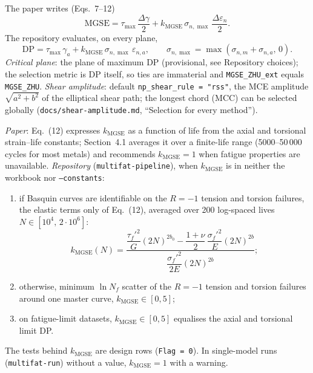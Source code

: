  The paper writes (Eqs.~7--12)
\begin{equation}
\mathrm{MGSE} = \tau_{\max}\,\frac{\Delta\gamma}{2} + k_\mathrm{MGSE}\,\sigma_{n,\max}\,\frac{\Delta\varepsilon_n}{2} .
\label{eq:mgsezhu-main}
\end{equation}
The repository evaluates, on every plane,
\begin{equation}
\mathrm{DP} = \tau_{\max}\,\gamma_a + k_\mathrm{MGSE}\,\sigma_{n,\max}\,\varepsilon_{n,a},\qquad
\sigma_{n,\max} = \max(\sigma_{n,m}+\sigma_{n,a},\,0) .
\label{eq:mgsezhu-plane}
\end{equation}
\emph{Critical plane}: the plane of maximum DP (provisional, see Repository choices); the selection
metric is DP itself, so ties are immaterial and \texttt{MGSE\_ZHU\_ext} equals \texttt{MGSE\_ZHU}.
\emph{Shear amplitude}: default \texttt{np\_shear\_rule = "rss"}, the MCE amplitude
$\sqrt{a^2+b^2}$ of the elliptical shear path; the longest chord (MCC) can be selected globally
(\texttt{docs/shear-amplitude.md}, ``Selection for every method'').

 \emph{Paper}: Eq.~(12) expresses $k_\mathrm{MGSE}$ as a function
of life from the axial and torsional strain--life constants; Section~4.1 averages it over a
finite-life range (5000--50\,000 cycles for most metals) and recommends $k_\mathrm{MGSE}=1$ when
fatigue properties are unavailable. \emph{Repository} (\texttt{multifat-pipeline}), when
$k_\mathrm{MGSE}$ is in neither the workbook nor \texttt{--constants}:
\begin{enumerate}
\item if Basquin curves are identifiable on the $R=-1$ tension and torsion failures, the elastic
  terms only of Eq.~(12), averaged over 200 log-spaced lives $N\in[10^4,\,2\cdot10^6]$:
  \begin{equation}
  k_\mathrm{MGSE}(N) = \frac{\dfrac{\tau_f'^2}{G}(2N)^{2b_0} - \dfrac{1+\nu}{2}\,\dfrac{\sigma_f'^2}{E}(2N)^{2b}}
  {\dfrac{\sigma_f'^2}{2E}(2N)^{2b}} ;
  \label{eq:mgsezhu-k}
  \end{equation}
\item otherwise, minimum $\ln N_f$ scatter of the $R=-1$ tension and torsion failures around one
  master curve, $k_\mathrm{MGSE}\in[0,5]$;
\item on fatigue-limit datasets, $k_\mathrm{MGSE}\in[0,5]$ equalises the axial and torsional
  limit DP.
\end{enumerate}
The tests behind $k_\mathrm{MGSE}$ are design rows (\texttt{Flag = 0}). In single-model runs
(\texttt{multifat-run}) without a value, $k_\mathrm{MGSE}=1$ with a warning.

